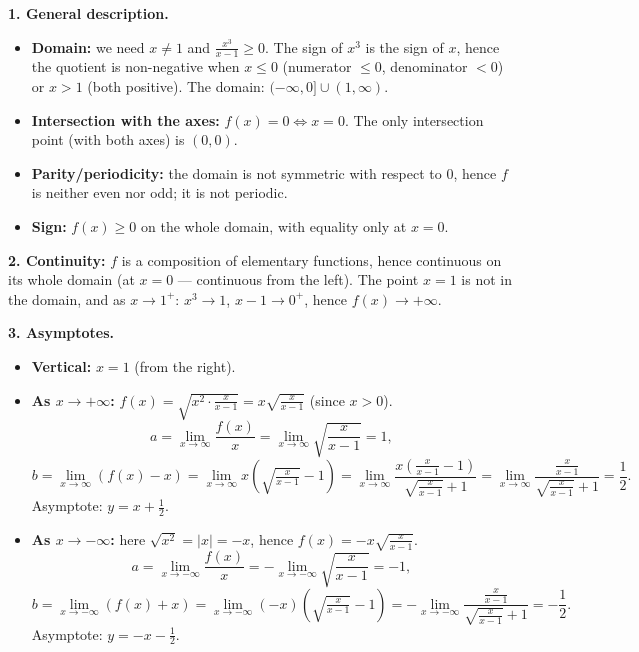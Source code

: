 \begin{solution}
\textbf{1. General description.}
\begin{itemize}
  \item \textbf{Domain:} we need $x\neq1$ and $\frac{x^3}{x-1}\ge0$. The sign of $x^3$ is the sign of $x$, hence the quotient is non-negative when $x\le0$ (numerator $\le0$, denominator $<0$) or $x>1$ (both positive). The domain: $(-\infty,0]\cup(1,\infty)$.
  \item \textbf{Intersection with the axes:} $f(x)=0\iff x=0$. The only intersection point (with both axes) is $(0,0)$.
  \item \textbf{Parity/periodicity:} the domain is not symmetric with respect to $0$, hence $f$ is neither even nor odd; it is not periodic.
  \item \textbf{Sign:} $f(x)\ge0$ on the whole domain, with equality only at $x=0$.
\end{itemize}

\textbf{2. Continuity:} $f$ is a composition of elementary functions, hence continuous on its whole domain (at $x=0$ — continuous from the left). The point $x=1$ is not in the domain, and as $x\to1^+$: $x^3\to1$, $x-1\to0^+$, hence $f(x)\to+\infty$.

\textbf{3. Asymptotes.}
\begin{itemize}
  \item \textbf{Vertical:} $x=1$ (from the right).
  \item \textbf{As $x\to+\infty$:} $f(x)=\sqrt{x^2\cdot\frac{x}{x-1}}=x\sqrt{\frac{x}{x-1}}$ (since $x>0$).
  \[ a=\lim_{x\to\infty}\frac{f(x)}{x}=\lim_{x\to\infty}\sqrt{\frac{x}{x-1}}=1, \]
  \[ b=\lim_{x\to\infty}\left(f(x)-x\right)=\lim_{x\to\infty}x\left(\sqrt{\tfrac{x}{x-1}}-1\right)=\lim_{x\to\infty}\frac{x\left(\frac{x}{x-1}-1\right)}{\sqrt{\frac{x}{x-1}}+1}=\lim_{x\to\infty}\frac{\frac{x}{x-1}}{\sqrt{\frac{x}{x-1}}+1}=\frac{1}{2}. \]
  Asymptote: $y=x+\frac12$.
  \item \textbf{As $x\to-\infty$:} here $\sqrt{x^2}=|x|=-x$, hence $f(x)=-x\sqrt{\frac{x}{x-1}}$.
  \[ a=\lim_{x\to-\infty}\frac{f(x)}{x}=-\lim_{x\to-\infty}\sqrt{\frac{x}{x-1}}=-1, \]
  \[ b=\lim_{x\to-\infty}\left(f(x)+x\right)=\lim_{x\to-\infty}(-x)\left(\sqrt{\tfrac{x}{x-1}}-1\right)=-\lim_{x\to-\infty}\frac{\frac{x}{x-1}}{\sqrt{\frac{x}{x-1}}+1}=-\frac12. \]
  Asymptote: $y=-x-\frac12$.
\end{itemize}


\end{solution}
